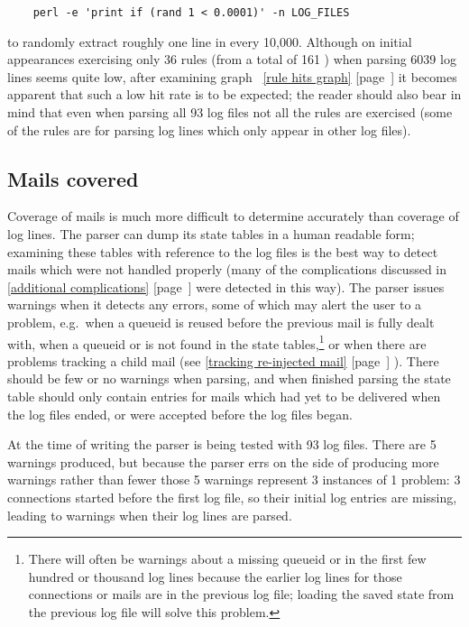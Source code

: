 \documentclass[a4paper,12pt,draft]{article}
\newcommand{\refwithpage}[1]{%
    \empty{}\ref{#1} [page~\pageref{#1}]%
}
\newcommand{\sectionref}[1]{%
    \textsection{}\refwithpage{#1}%
}
\newcommand{\numberOFlogFILES}[0]{%
    93%
}
\newcommand{\numberOFrules}[0]{%
    161%
}
\begin{document}
\verb!    perl -e 'print if (rand 1 < 0.0001)' -n LOG_FILES!

\noindent{}to randomly extract roughly one line in every 10,000.  Although
on initial appearances exercising only 36 rules (from a total of
\numberOFrules{}) when parsing 6039 log lines seems quite low, after
examining graph~\refwithpage{rule hits graph} it becomes apparent that such
a low hit rate is to be expected; the reader should also bear in mind that
even when parsing all \numberOFlogFILES{} log files not all the rules are
exercised (some of the rules are for parsing log lines which only appear in
other log files).

\subsection{Mails covered}

\label{mails-covered}

Coverage of mails is much more difficult to determine accurately than
coverage of log lines.  The parser can dump its state tables in a human
readable form; examining these tables with reference to the log files is
the best way to detect mails which were not handled properly (many of the
complications discussed in \sectionref{additional complications} were
detected in this way).  The parser issues warnings when it detects any
errors, some of which may alert the user to a problem, e.g.\ when a queueid
is reused before the previous mail is fully dealt with, when a queueid or
\pid{} is not found in the state tables,\footnote{There will often be
warnings about a missing queueid or \pid{} in the first few hundred or
thousand log lines because the earlier log lines for those connections or
mails are in the previous log file; loading the saved state from the
previous log file will solve this problem.} or when there are problems
tracking a child mail (see \sectionref{tracking re-injected mail}).  There
should be few or no warnings when parsing, and when finished parsing the
state table should only contain entries for mails which had yet to be
delivered when the log files ended, or were accepted before the log files
began.

At the time of writing the parser is being tested with \numberOFlogFILES{}
log files.  There are 5 warnings produced, but because the parser errs on
the side of producing more warnings rather than fewer those 5 warnings
represent 3 instances of 1 problem: 3 connections started before the first
log file, so their initial log entries are missing, leading to warnings
when their log lines are parsed.
\end{document}

